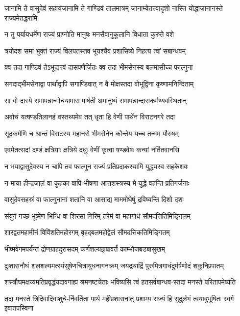 \twolineshloka
{जानामि ते वासुदेवं सहायंजानामि ते गाण्डिवं तालमात्रम्}
{जानाम्येतत्त्वादृशो नास्ति योद्धाजानानस्ते राज्यमेतद्धरामि}


\twolineshloka
{न तु पर्यायधर्मेण राज्यं प्राप्नोति मानुषः}
{मनसैवानुकूलानि विधाता कुरुते वशे}


\twolineshloka
{त्रयोदश समा भुक्तं राज्यं विलपतस्तव}
{भूयश्चैव प्रशासिष्ये निहत्य त्वां सबान्धवम्}


\twolineshloka
{क्व तदा गाण्डिवं तेऽभूद्यत्त्वं दासपणैर्जितः}
{क्व तदा भीमसेनस्य बलमासीच्च फाल्गुना}


\twolineshloka
{सगदाद्भीमसेनाद्वा पार्थाद्वापि सगाण्डिवात्}
{न वै मोक्षस्तदा वोभूद्विना कृष्णामनिन्दिताम्}


\twolineshloka
{सा वो दास्ये समापन्नान्मोचयामास पार्षती}
{अमानुष्यं समापन्नान्दासकर्मण्यवस्थितान्}


\twolineshloka
{अवोचं यत्षण्डतिलानहं वस्तथ्यमेव तत्}
{धृता हि वेणी पार्थेन विराटनगरे तदा}


\twolineshloka
{सूदकर्मणि च श्रान्तं विराटस्य महानसे}
{भीमसेनेन कौन्तेय यच्च तन्मम पौरुषम्}


\twolineshloka
{एवमेतत्सदां दण्डं क्षत्रियाः क्षत्रिये दधुः}
{वेणीं कृत्वा षण्डवेषः कन्यां नर्तितवानसि}


\twolineshloka
{न भयाद्वासुदेवस्य न चापि तव फाल्गुन}
{राज्यं प्रतिप्रदाकस्यामि युद्ध्यस्व सहकेशवः}


\twolineshloka
{न माया हीन्द्रजालं वा कुहका वापि भीषणा}
{आत्तशस्त्रस्य मे युद्धे वहन्ति प्रतिगर्जनाः}


\twolineshloka
{वासुदेवसहस्रं वा फाल्गुनानां शतानि वा}
{आसाद्य माममोघेषुं द्रविष्यन्ति दिशो दशः}


\twolineshloka
{संयुगं गच्छ भूष्मेण भिन्धि वा शिरसा गिरिम्}
{तरेमं वा महागाधं सौमदत्तितिमिङ्गिलम्}


\twolineshloka
{शारद्वतमहामीनं विविंशतिमहोरगम्}
{बृहद्बलमहोद्वेलं सौमदत्तिकतिमिङ्गितम्}


\twolineshloka
{भीष्मवेगमपर्यन्तं द्रोणग्राहदुरासदम्}
{कर्णशल्यझषावर्तं काम्भोजबडबासुखम्}


\twolineshloka
{दुःशासनौघं शलशल्यमत्स्यंसुषेणचित्रायुधनागनक्रम्}
{जयद्रथाद्रिं पुरुमित्रगाधंदुर्मर्षणोदं शकुनिप्रपातम्}


\twolineshloka
{शस्त्रौघमक्षय्यमतिप्रवृद्धंयदावगाह्य श्रमनष्टचेताः}
{भविष्यसि त्वं हतसर्वबान्धव-स्तदा मनस्ते परितापमेष्यति}


\twolineshloka
{तदा मनस्ते त्रिदिवादिवाशुचे-र्निवर्तिता पार्थ महीप्रशासनात्}
{प्रशाम्य राज्यं हि सुदुर्लभं त्वयाबुभूषितः स्वर्ग इवातपस्विना}


